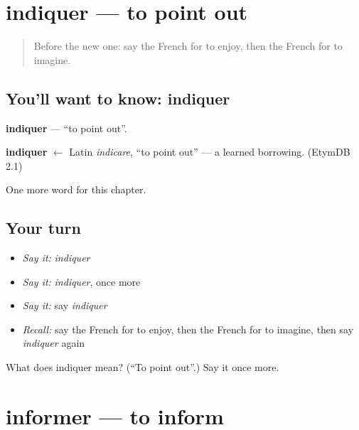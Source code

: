 \section[indiquer]{indiquer — to point out}

\label{lesson:FR-C209-indiquer}



\begin{quote}
Before the new one: say the French for to enjoy, then the French for to imagine.
\end{quote}

\subsection*{You'll want to know: indiquer}
\textbf{indiquer} — \textquotedblleft{}to point out\textquotedblright{}.

\begin{cousinweb}
\textbf{indiquer} $\leftarrow$ Latin \emph{indicare}, \textquotedblleft{}to point out\textquotedblright{} — a learned borrowing. (EtymDB 2.1)
\end{cousinweb}

\begin{grammarlens}[title={What you've built}]
One more word for this chapter.
\end{grammarlens}

\subsection*{Your turn}
\begin{itemize}
\raggedright
  \item \emph{Say it:} \emph{indiquer}
  \item \emph{Say it:} \emph{indiquer}, once more
  \item \emph{Say it:} say \emph{indiquer}
  \item \emph{Recall:} say the French for to enjoy, then the French for to imagine, then say \emph{indiquer} again
\end{itemize}

\begin{tcolorbox}[breakable,colback=teal!4,colframe=teal!35!black,title={Before you move on}]
What does indiquer mean? (\textquotedblleft{}To point out\textquotedblright{}.) Say it once more.
\end{tcolorbox}
\section[informer]{informer — to inform}


